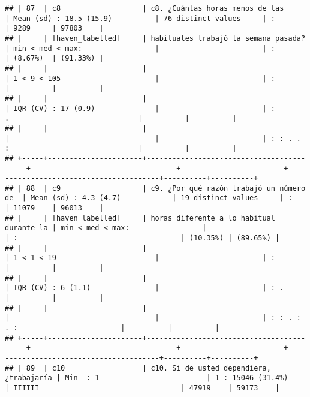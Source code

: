\documentclass[]{article}
\begin{document}
\begin{verbatim}
## | 87  | c8                   | c8. ¿Cuántas horas menos de las          | Mean (sd) : 18.5 (15.9)          | 76 distinct values     | :                                      | 9289     | 97803    |
## |     | [haven_labelled]     | habituales trabajó la semana pasada?     | min < med < max:                 |                        | :                                      | (8.67%)  | (91.33%) |
## |     |                      |                                          | 1 < 9 < 105                      |                        | :                                      |          |          |
## |     |                      |                                          | IQR (CV) : 17 (0.9)              |                        | :       .                              |          |          |
## |     |                      |                                          |                                  |                        | : : . . :                              |          |          |
## +-----+----------------------+------------------------------------------+----------------------------------+------------------------+----------------------------------------+----------+----------+
## | 88  | c9                   | c9. ¿Por qué razón trabajó un número de  | Mean (sd) : 4.3 (4.7)            | 19 distinct values     | :                                      | 11079    | 96013    |
## |     | [haven_labelled]     | horas diferente a lo habitual durante la | min < med < max:                 |                        | :                                      | (10.35%) | (89.65%) |
## |     |                      |                                          | 1 < 1 < 19                       |                        | :                                      |          |          |
## |     |                      |                                          | IQR (CV) : 6 (1.1)               |                        | : .                                    |          |          |
## |     |                      |                                          |                                  |                        | : : . :     . :                        |          |          |
## +-----+----------------------+------------------------------------------+----------------------------------+------------------------+----------------------------------------+----------+----------+
## | 89  | c10                  | c10. Si de usted dependiera, ¿trabajaría | Min  : 1                         | 1 : 15046 (31.4%)      | IIIIII                                 | 47919    | 59173    |

\end{verbatim}
\end{document}
